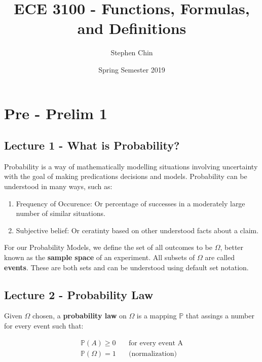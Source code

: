 \documentclass{article} \usepackage[utf8]{inputenc}
\title{ECE 3100 - Functions, Formulas, and Definitions}
\author{Stephen Chin} \date{Spring Semester 2019}
\begin{document}
\maketitle

\section{Pre - Prelim 1}

\subsection{Lecture 1 - What is Probability?}

Probability is a way of mathematically modelling situations involving
uncertainty with the goal of making predications decisions and models.
Probability can be understood in many ways, such as:

\begin{enumerate}
\item Frequency of Occurence: Or percentage of successes in a
  moderately large number of similar situations.
  
\item Subjective belief: Or ceratinty based on other understood facts
  about a claim.
\end{enumerate}

For our Probability Models, we define the set of all outcomes to be
$\Omega$, better known as the \textbf{sample space} of an
experiment. All subsets of $\Omega$ are called \textbf{events}. These
are both sets and can be understood using default set notation.


\subsection{Lecture 2 - Probability Law}

Given $\Omega$ chosen, a \textbf{probability law} on $\Omega$ is a
mapping $\mathbb{P}$ that assings a number for every event such that:

\begin{equation} \tag{Kolmogorov's Axioms} \boxed{
    \begin{aligned} \mathbb{P}(A) \ge 0 & \quad \text{for every event
        A} \\ \mathbb{P}(\Omega) = 1 & \quad \text{(normalization)}
    \end{aligned} }
\end{equation}
\end{document}
